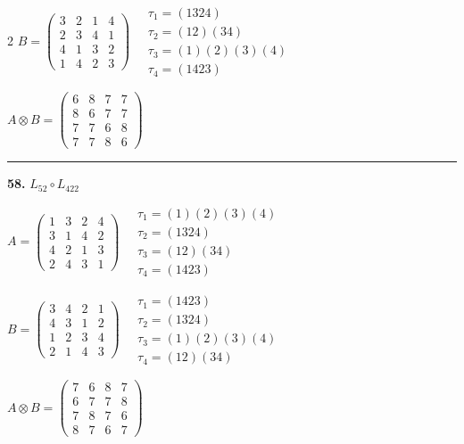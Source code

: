 \begin{multicols}{2}
$B = \begin{pmatrix} 3 & 2 & 1 & 4 \\ 2 & 3 & 4 & 1 \\ 4 & 1 & 3 & 2 \\ 1 & 4 & 2 & 3 \end{pmatrix} \quad \begin{matrix} \tau_{1}=(1 3 2 4) \\ \tau_{2}=(1 2)(3 4) \\ \tau_{3}=(1)(2)(3)(4) \\ \tau_{4}=(1 4 2 3) \end{matrix}$

$A \otimes B = \begin{pmatrix} 6 & 8 & 7 & 7 \\ 8 & 6 & 7 & 7 \\ 7 & 7 & 6 & 8 \\ 7 & 7 & 8 & 6 \end{pmatrix}$

\vspace{0.3em}
\hrule
\vspace{0.3em}

\noindent\textbf{58.} $L_{52} \circ L_{422}$

$A = \begin{pmatrix} 1 & 3 & 2 & 4 \\ 3 & 1 & 4 & 2 \\ 4 & 2 & 1 & 3 \\ 2 & 4 & 3 & 1 \end{pmatrix} \quad \begin{matrix} \tau_{1}=(1)(2)(3)(4) \\ \tau_{2}=(1 3 2 4) \\ \tau_{3}=(1 2)(3 4) \\ \tau_{4}=(1 4 2 3) \end{matrix}$

$B = \begin{pmatrix} 3 & 4 & 2 & 1 \\ 4 & 3 & 1 & 2 \\ 1 & 2 & 3 & 4 \\ 2 & 1 & 4 & 3 \end{pmatrix} \quad \begin{matrix} \tau_{1}=(1 4 2 3) \\ \tau_{2}=(1 3 2 4) \\ \tau_{3}=(1)(2)(3)(4) \\ \tau_{4}=(1 2)(3 4) \end{matrix}$

$A \otimes B = \begin{pmatrix} 7 & 6 & 8 & 7 \\ 6 & 7 & 7 & 8 \\ 7 & 8 & 7 & 6 \\ 8 & 7 & 6 & 7 \end{pmatrix}$


\end{multicols}
